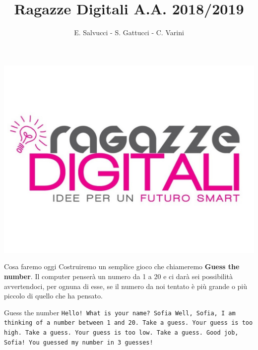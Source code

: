 \documentclass{beamer}
\title[Ragazze Digitali 2019]{Ragazze Digitali A.A. 2018/2019}
\author{E. Salvucci - S. Gattucci - C. Varini}
\date{}
\begin{document}
{\includegraphics[width=\paperwidth,height=\paperheight]{images/ragazze_digitali.jpg}}
\begin{frame}
\end{frame}


\begin{frame}{Cosa faremo oggi}
    \vspace{0.8cm}
      Costruiremo un semplice gioco che chiameremo \textbf{Guess the number}. \newline
      Il computer penserà un numero da 1 a 20 e ci darà sei possibilità avvertendoci, per ognuna di esse, se il numero da noi tentato è più grande o più piccolo di quello che ha pensato.
\end{frame}

\begin{frame}{Guess the number}
    \texttt{Hello! What is your name?\newline
        Sofia\newline
        Well, Sofia, I am thinking of a number between 1 and 20.\newline
        Take a guess.\newline
        Your guess is too high.\newline
        Take a guess.\newline
        Your guess is too low.\newline
        Take a guess.\newline
        Good job, Sofia! You guessed my number in 3 guesses!
    }
\end{frame}
\end{document}
